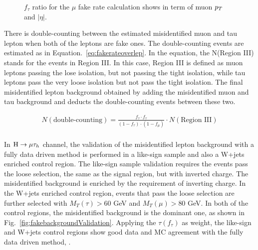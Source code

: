 \begin{figure}[htbp] 
     \centering
     \caption{$f_{\tau}$ ratio for the $\mu$ fake rate calculation shows in term of muon $p_{T}$ and $|\eta|$.}
     \label{fig:muonfakerationumber}
\end{figure}

There is double-counting between the estimated misidentified muon and tau lepton when both of the leptons are fake ones. The double-counting events are estimated as in Equation.~\ref{eq:fakerateoverlep}. In the equation, the N(Region III) stands for the events in Region III. In this case, Region III is defined as muon leptons passing the lose isolation, but not passing the tight isolation, while tau leptons pass the very loose isolation but not pass the tight isolation. The final misidentified lepton background obtained by adding the misidentified muon and tau background and deducts the double-counting events between these two. 

\begin{align} 
N(\text{double-counting})=\frac{f_{\tau}\cdot f_{\tau}}{(1-f_{\tau})\cdot (1-f_{\mu})}\cdot N(\text{Region\ III}) \\\label{eq:fakerateoverlep}
\end{align}



In $\mathrm{H}\to \mu\tau_{h}$ channel, the validation of the misidentified lepton background with a fully data driven method is performed in a like-sign sample and also a W+jets enriched control region. The like-sign sample validation requires the events pass the loose selection, the same as the signal region, but with inverted charge. The misidentified background is enriched by the requirement of inverting charge. In the W+jets enriched control region, events that pass the loose selection are further selected with  $M_T(\tau)>60$ GeV and $M_T(\mu)>80$ GeV.  In both of the control regions, the misidentified background is the dominant one, as shown in Fig.~\ref{fig:fakebackgroundValidation}. Applying the $\tau(f_{\tau})$ as weight, the like-sign and W+jets control regions show good data and MC agreement with the fully data driven method, . 


